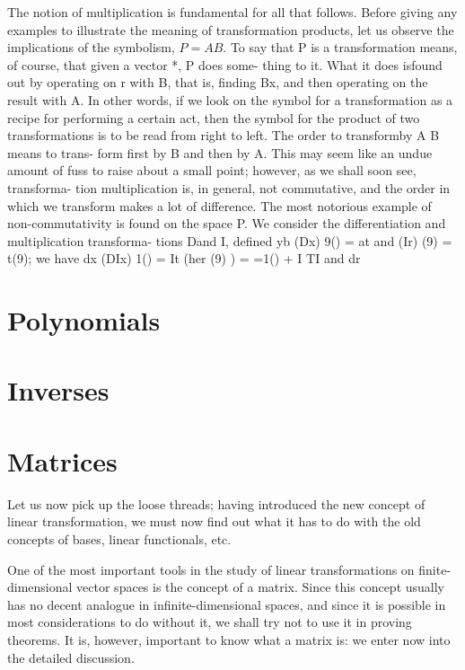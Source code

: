 The notion of multiplication is fundamental for all that follows. Before giving
any examples to illustrate the meaning of transformation products, let us
observe the implications of the symbolism, \(P = AB\). To say that P is a
transformation means, of course, that given a vector *, P does some- thing to
it. What it does isfound out by operating on r with B, that is, finding Bx, and
then operating on the result with A. In other words, if we look on the symbol
for a transformation as a recipe for performing a certain act, then the symbol
for the product of two transformations is to be read from right to left. The
order to transformby A B means to trans- form first by B and then by A. This may
seem like an undue amount of fuss to raise about a small point; however, as we
shall soon see, transforma- tion multiplication is, in general, not commutative,
and the order in which we transform makes a lot of difference. The most
notorious example of non-commutativity is found on the space P. We consider the
differentiation and multiplication transforma- tions Dand I, defined yb (Dx) 9()
= at and (Ir) (9) = t(9); we have dx (DIx) 1() = It (her (9) ) = =1() + I TI and
dr

\section{Polynomials}

\section{Inverses}

\section{Matrices}

Let us now pick up the loose threads; having introduced the new concept of
linear transformation, we must now find out what it has to do with the old
concepts of bases, linear functionals, etc.

One of the most important tools in the study of linear transformations on
finite-dimensional vector spaces is the concept of a matrix. Since this concept
usually has no decent analogue in infinite-dimensional spaces, and since it is
possible in most considerations to do without it, we shall try not to use it in
proving theorems. It is, however, important to know what a matrix is: we enter
now into the detailed discussion.

